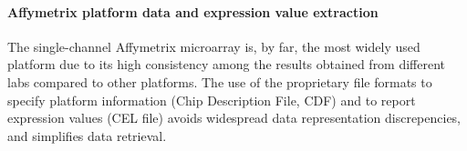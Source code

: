 














\paragraph{Affymetrix platform data and expression value extraction}


%
The single-channel Affymetrix microarray is, by far, the most widely used
platform due to its high consistency among the results obtained from different
labs compared to other platforms\cite{Irizarry2005}.
%
The use of the proprietary file formats to specify platform information (Chip
Description File, CDF) and to report expression values (CEL file) avoids
widespread data representation discrepencies, and simplifies data retrieval.



